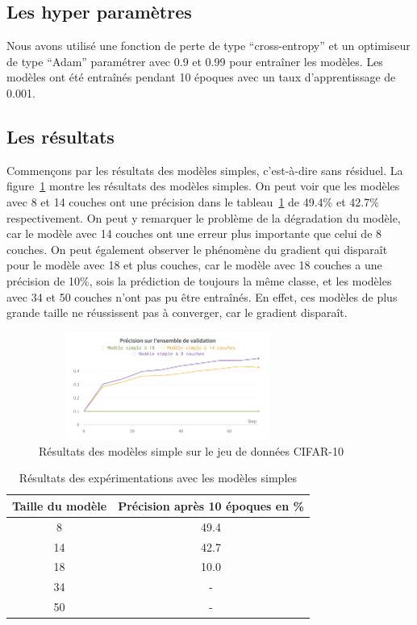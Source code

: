 \documentclass{article}
\begin{document}
\subsection{Les hyper paramètres}

Nous avons utilisé une fonction de perte de type ``cross-entropy'' et un optimiseur de type ``Adam'' paramétrer avec 0.9 et 0.99
pour entraîner les modèles.
Les modèles ont été entraînés pendant 10 époques avec un taux d'apprentissage de 0.001.

\subsection{Les résultats}

Commençons par les résultats des modèles simples, c'est-à-dire sans résiduel. La figure~\ref{fig:result_plain} montre
les résultats des modèles simples. On peut voir que les modèles avec 8 et 14 couches ont une précision dans le tableau~\ref{tab:result_plain}
de 49.4\% et 42.7\% respectivement. On peut y remarquer le problème de la dégradation du modèle, car le modèle avec 14 couches ont une erreur
plus importante que celui de 8 couches. On peut également observer le phénomène du gradient qui disparaît pour le modèle avec 18 et plus couches,
car le modèle avec 18 couches a une précision de 10\%, sois la prédiction de toujours la même classe, et les modèles avec 34 et 50 couches n'ont pas pu être entraînés.
En effet, ces modèles de plus grande taille ne réussissent pas à converger, car le gradient disparaît.

\begin{figure}[h]
    \centering
    \includegraphics[width=240pt,height=100pt]{./img/result_plain.png}
    \caption{Résultats des modèles simple sur le jeu de données CIFAR-10}\label{fig:result_plain}
\end{figure}

\begin{table}[H]
    \centering
    \begin{tabular}{cc}
    \hline
    Taille du modèle & Précision après 10 époques en \% \\
    \hline
    8 & 49.4 \\
    14 & 42.7 \\
    18 & 10.0 \\
    34 & - \\
    50 & - \\
    \hline
    \end{tabular}
    \caption{Résultats des expérimentations avec les modèles simples}\label{tab:result_plain}
\end{table}
\end{document}
